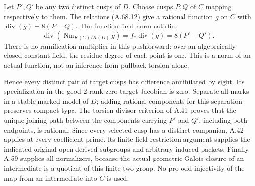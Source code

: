 Let \(P',Q'\) be any two distinct cusps of \(D\). Choose
cusps \(P,Q\) of \(C\) mapping respectively to them. The
relations (A.68.12) give a rational function \(g\) on \(C\)
with \(\operatorname{div}(g)=8(P-Q)\). The function-field
norm satisfies
\[
 \operatorname{div}(\operatorname{Nm}_{K(C)/K(D)}g)
       =f_*\operatorname{div}(g)=8(P'-Q').
\]
There is no ramification multiplier in this pushforward: over
an algebraically closed constant field, the residue degree
of each point is one. This is a norm of an actual function,
not an inference from pullback torsion alone.

Hence every distinct pair of target cusps has difference
annihilated by eight. Its specialization in the good
\(2\)-rank-zero target Jacobian is zero. Separate all marks
in a stable marked model of \(D\); adding rational components
for this separation preserves compact type. The torsion-divisor
criterion of A.41 proves that the unique joining path between
the components carrying \(P'\) and \(Q'\), including both
endpoints, is rational. Since every selected cusp has a
distinct companion, A.42 applies at every coefficient prime.
Its finite-field-restriction argument supplies the indicated
original open-derived subgroups and arbitrary induced packets.
Finally A.59 supplies all normalizers, because the actual
geometric Galois closure of an intermediate is a quotient
of this finite two-group. No pro-odd injectivity of the map
from an intermediate into \(C\) is used.
